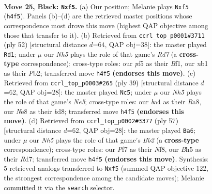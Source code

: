 \documentclass[11pt]{article}
\begin{document}
\clearpage

\begin{figure}[p]\centering
\begin{subfigure}{0.46\textwidth}\centering
\resizebox{\linewidth}{!}{%
\newchessgame
\chessboard[
  setfen={1r2n1k1/2p2ppp/p7/4pP1b/B1P4n/P7/6P1/RNB3K1 b - - 1 25},
  showmover=false,
  pgfstyle=straightmove, color=movearrow, markmove={h4-f5}
]}
\caption{}
\end{subfigure}\hfill
\begin{subfigure}{0.46\textwidth}\centering
\resizebox{\linewidth}{!}{%
\newchessgame
\chessboard[
  setfen={5rk1/3R2p1/p1n1p1P1/2p1b3/Np2P3/8/PPP5/1K3B2 w - - 1 27},
  showmover=false,
  pgfstyle=straightmove, color=movearrow, markmove={d7-d1}
]}
\caption{}
\end{subfigure}
\\[4pt]
\begin{subfigure}{0.46\textwidth}\centering
\resizebox{\linewidth}{!}{%
\newchessgame
\chessboard[
  setfen={r2B2k1/1p3pp1/2p4p/5b2/p3n2P/P7/1PP1BPP1/3R2K1 b - - 0 20},
  showmover=false,
  pgfstyle=straightmove, color=movearrow, markmove={e4-c5}
]}
\caption{}
\end{subfigure}\hfill
\begin{subfigure}{0.46\textwidth}\centering
\resizebox{\linewidth}{!}{%
\newchessgame
\chessboard[
  setfen={5nk1/1b1r1ppp/4p3/ppR1P3/5P1P/8/PB2PPB1/6K1 b - - 0 29},
  showmover=false,
  pgfstyle=straightmove, color=movearrow, markmove={b7-a6}
]}
\caption{}
\end{subfigure}
\caption{\textbf{Move 25, Black: \texttt{Nxf5}.} (a) Our position; Melanie plays \texttt{Nxf5} (\texttt{h4f5}). Panels (b)--(d) are the retrieved master positions whose correspondence most drove this move (highest QAP objective among those that transfer to it). (b) Retrieved from \texttt{ccrl\_top\_p0001\#3711} (ply 52) [structural distance $d$=64, QAP obj=38]: the master played \texttt{Rd1}; under $\mu$ our \emph{Nh5} plays the role of that game's \emph{Rd7} (a \textbf{cross-type} correspondence); cross-type roles: our \emph{p}f5 as their \emph{B}f1, our \emph{n}b1 as their \emph{P}b2; transferred move \texttt{h4f5} \textbf{(endorses this move)}. (c) Retrieved from \texttt{ccrl\_top\_p0003\#265} (ply 39) [structural distance $d$=62, QAP obj=28]: the master played \texttt{Nc5}; under $\mu$ our \emph{Nh5} plays the role of that game's \emph{Ne5}; cross-type roles: our \emph{b}a4 as their \emph{R}a8, our \emph{N}e8 as their \emph{b}d8; transferred move \texttt{h4f5} \textbf{(endorses this move)}. (d) Retrieved from \texttt{ccrl\_top\_p0002\#3377} (ply 57) [structural distance $d$=62, QAP obj=28]: the master played \texttt{Ba6}; under $\mu$ our \emph{Nh5} plays the role of that game's \emph{Bb2} (a \textbf{cross-type} correspondence); cross-type roles: our \emph{P}f7 as their \emph{N}f8, our \emph{B}h5 as their \emph{R}d7; transferred move \texttt{h4f5} \textbf{(endorses this move)}. Synthesis: 5 retrieved analogs transferred to \texttt{Nxf5} (summed QAP objective 122, the strongest correspondence among the candidate moves); Melanie committed it via the \texttt{search} selector.}
\label{fig:thought-m49}
\end{figure}
\end{document}
